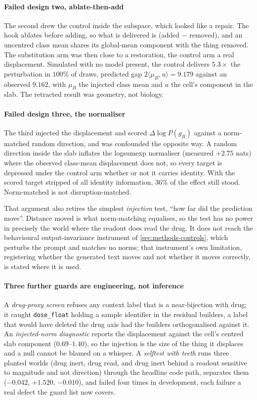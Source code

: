 \paragraph{Failed design two, ablate-then-add} The second drew the control
inside the subspace, which looked like a repair. The hook ablates
before adding, so what is delivered is (added $-$ removed), and an uncentred
class mean shares its global-mean component with the thing removed. The
substitution arm was then close to a restoration, the control arm a real
displacement. Simulated with no model present, the control delivers $5.3\times$
the perturbation in $100\%$ of draws, predicted gap
$2\langle \mu_B, u\rangle = 9.179$ against an observed $9.162$, with $\mu_B$ the
injected class mean and $u$ the cell's component in the slab. The retracted
result was geometry, not biology.

\paragraph{Failed design three, the normaliser} The third injected the
displacement and scored $\Delta \log P(g_B)$ against a norm-matched random
direction, and was confounded the opposite way. A random direction inside the
slab inflates the logsumexp normaliser (measured $+2.75$ nats) where the
observed class-mean displacement does not, so every target is depressed under
the control arm whether or not it carries identity. With the scored target
stripped of all identity information, $36\%$ of the effect still stood.
Norm-matched is not disruption-matched.

That argument also retires the simplest \emph{injection} test, ``how far did the
prediction move''. Distance moved is what norm-matching equalises, so the test
has no power in precisely the world where the readout does read the drug. It
does not reach the behavioural output-invariance instrument of
\cref{sec:methods-controls}, which perturbs the prompt and matches no norms;
that instrument's own limitation, registering whether the generated text moves
and not whether it moves correctly, is stated where it is used.

\paragraph{Three further guards are engineering, not inference} A
\emph{drug-proxy screen} refuses any context label that is a near-bijection with
drug; it caught \texttt{dose\_float} holding a sample identifier in the residual
builders, a label that would have deleted the drug axis had the builders
orthogonalised against it. An \emph{injected-norm diagnostic} reports the
displacement against the cell's centred slab component ($0.69$--$1.40$), so the
injection is the size of the thing it displaces and a null cannot be blamed on a
whisper. A \emph{selftest with teeth} runs three planted worlds
(drug inert, drug read, and drug inert behind a readout sensitive to magnitude
and not direction) through the headline code path, separates them ($-0.042$,
$+1.520$, $-0.010$), and failed four times in development, each failure a real
defect the guard list now covers.

